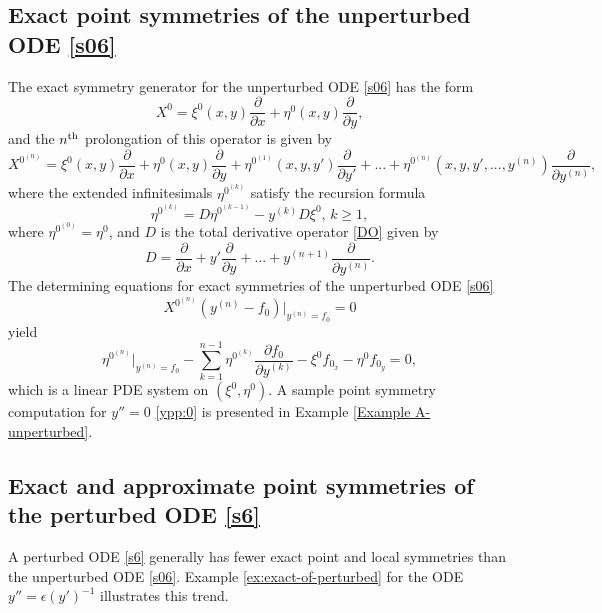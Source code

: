 \documentclass[11pt,letter,subeqn]{article}
\begin{document}
  \subsection{Exact point symmetries of the unperturbed ODE \eqref{s06}}
  The exact symmetry generator for the unperturbed ODE \eqref{s06} has the form
  \begin{equation}\label{exact genarator}
    X^{0}=\xi^0(x,y)\dfrac{\partial}{\partial x}+ \eta^0(x,y) \dfrac{\partial}{\partial y},
  \end{equation}
  and the $n^{\rm th}$ prolongation of this operator is given by
  \[
    X^{0^{(n)}}=\xi^0(x,y)\dfrac{\partial}{\partial x}+ \eta^0(x,y) \dfrac{\partial}{\partial y}+ \eta^{0^{(1)}}(x,y,y') \dfrac{\partial}{\partial
    y'}+...+\eta^{0^{(n)}}(x,y,y',...,y^{(n)}) \dfrac{\partial}{\partial y^{(n)}},
  \]
  where the extended infinitesimals $\eta^{0^{(k)}}$ satisfy the recursion formula
  \begin{equation}\label{s10}
    \eta^{0^{(k)}}=D\eta^{0^{(k-1)}}-y^{(k)}D\xi^0,\, k\geq1,
  \end{equation}
  where $\eta^{0^{(0)}}=\eta^0$, and $D$ is the total derivative operator \eqref{DO} given by
  \begin{equation}\label{hj}
     D=\dfrac{\partial}{\partial x}+y'\dfrac{\partial}{\partial y}+...+y^{(n+1)}\dfrac{\partial}{\partial y^{(n)}}.
  \end{equation}
  The determining equations for exact symmetries of the unperturbed ODE \eqref{s06}
   \begin{equation}\label{det}
      X^{0^{(n)}}(y^{(n)}-f_0)\bigg|_{y^{(n)}=f_0}=0
   \end{equation}
   yield
   \begin{equation}\label{det1}
     \eta^{0^{(n)}}\bigg|_{y^{(n)}=f_0}-\sum_{k=1}^{n-1}\eta^{0^{(k)}}\frac{\partial f_0}{\partial y^{(k)}}-\xi^0 f_{0_x}-\eta^0 f_{0_y}=0,
   \end{equation}
   which is a linear PDE system on $(\xi^0,\eta^0).$ A sample point symmetry computation for $y''=0$ \eqref{ypp:0} is presented in Example \ref{Example A-unperturbed}.
   \subsection{Exact and approximate point symmetries of the perturbed ODE \eqref{s6}}
  A perturbed ODE \eqref{s6} generally has fewer exact point and local symmetries than the unperturbed ODE \eqref{s06}. Example \ref{ex:exact-of-perturbed} for the ODE $y''=\epsilon (y')^{-1}$ illustrates this trend.
\end{document}
